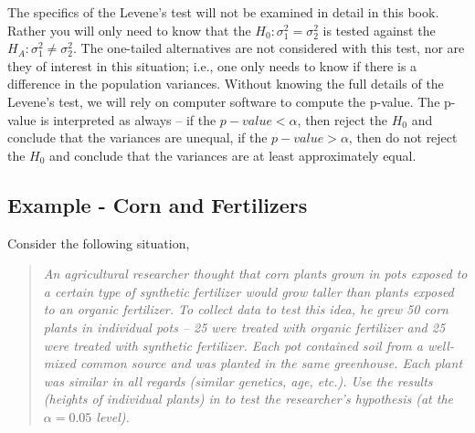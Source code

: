 \documentclass[10pt,openany]{book}\usepackage[]{graphicx}\usepackage[]{color}
\begin{document}

The specifics of the Levene's test will not be examined in detail in this book.  Rather you will only need to know that the $H_{0}:\sigma_{1}^{2}=\sigma_{2}^{2}$ is tested against the $H_{A}:\sigma_{1}^{2}\neq\sigma_{2}^{2}$.  The one-tailed alternatives are not considered with this test, nor are they of interest in this situation; i.e., one only needs to know if there is a difference in the population variances.  Without knowing the full details of the Levene's test, we will rely on computer software to compute the p-value.  The p-value is interpreted as always -- if the $p-value<\alpha$, then reject the $H_{0}$ and conclude that the variances are unequal, if the $p-value>\alpha$, then do not reject the $H_{0}$ and conclude that the variances are at least approximately equal.


\vspace{-12pt}

\subsection{Example - Corn and Fertilizers}
Consider the following situation,
\begin{quote}
\textsl{An agricultural researcher thought that corn plants grown in pots exposed to a certain type of synthetic fertilizer would grow taller than plants exposed to an organic fertilizer.  To collect data to test this idea, he grew 50 corn plants in individual pots -- 25 were treated with organic fertilizer and 25 were treated with synthetic fertilizer.  Each pot contained soil from a well-mixed common source and was planted in the same greenhouse.  Each plant was similar in all regards (similar genetics, age, etc.).  Use the results (heights of individual plants) in  to test the researcher's hypothesis (at the $\alpha=0.05$ level).}
\end{quote}
\end{document}
